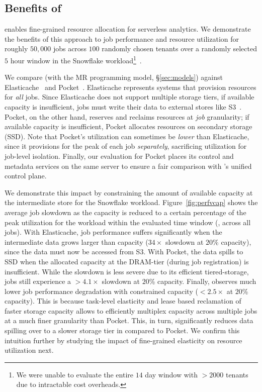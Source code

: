 \subsection{Benefits of \jiffy}
\label{ssec:overallbenefits}

\jiffy enables fine-grained resource allocation for serverless analytics. We demonstrate the benefits of this approach to job performance and resource utilization for roughly $50,000$ jobs across $100$ randomly chosen tenants over a randomly selected $5$ hour window in the Snowflake workload\footnote{{We were unable to evaluate the entire $14$ day window with $>2000$ tenants due to intractable cost overheads.}}~\cite{snowset}. 

We compare \jiffy (with the MR programming model, \S\ref{sec:models}) against Elasticache~\cite{elasticache} and Pocket~\cite{pocket}. Elasticache represents systems that provision resources for \textit{all} jobs. Since Elasticache does not support multiple storage tiers, if available capacity is insufficient, jobs must write their data to external stores like S3~\cite{s3}. Pocket, on the other hand, reserves and reclaims resources at \textit{job} granularity; if available capacity is insufficient, Pocket allocates resources on secondary storage (SSD). Note that Pocket's utilization can sometimes be \textit{lower} than Elasticache, since it provisions for the peak of each job \textit{separately}, sacrificing utilization for job-level isolation. Finally, our evaluation for Pocket places its control and metadata services on the same server to ensure a fair comparison with \jiffy's unified control plane.

 We demonstrate this impact by constraining the amount of available capacity at the intermediate store for the Snowflake workload. Figure~\ref{fig:perfvcap} shows the average job slowdown as the capacity is reduced to a certain percentage of the peak utilization for the workload within the evaluated time window (\ie, across all jobs). With Elasticache, job performance suffers significantly when the intermediate data grows larger than capacity ($34\times$ slowdown at $20$\% capacity), since the data must now be accessed from S3. With Pocket, the data spills to SSD when the allocated capacity at the DRAM-tier (during job registration) is insufficient. While the slowdown is less severe due to its efficient tiered-storage, jobs still experience a $>4.1\times$ slowdown at $20$\% capacity. Finally, \jiffy observes much lower job performance degradation with constrained capacity ($<2.5\times$ at $20$\% capacity). This is because task-level elasticity and lease based reclamation of faster storage capacity allows \jiffy to efficiently multiplex capacity across multiple jobs at a much finer granularity than Pocket. This, in turn, significantly reduces data spilling over to a slower storage tier in \jiffy compared to Pocket. We confirm this intuition further by studying the impact of fine-grained elasticity on resource utilization next. 

